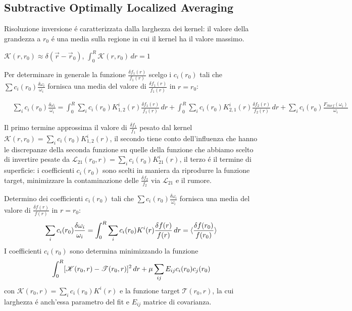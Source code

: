 \documentclass[../main.tex]{subfiles}
\begin{document}
\subsection{Subtractive Optimally Localized Averaging}

\begin{workout}
Risoluzione inversione \'e caratterizzata dalla larghezza dei kernel: il valore della grandezza a $r_0$ \'e una media sulla regione in cui il kernel ha il valore massimo.
\end{workout}

\begin{workout}[OLA]
$\mathcal{K}(r,r_0)\approx\delta(\vec{r}-\vec{r}_0)$, $\int_0^R\mathcal{K}(r,r_0)\,dr=1$
\end{workout}

\begin{workout}

Per determinare in generale la funzione $\frac{\delta f_1(r)}{f_1(r)}$ scelgo i $c_i(r_0)$ tali che $\sum c_i(r_0)\frac{\delta\omega_i}{\omega_i}$ fornisca una media del valore di $\frac{\delta f_1(r)}{f_1(r)}$ in $r=r_0$:

\begin{align*}
&\sum_ic_i(r_0)\frac{\delta\omega_i}{\omega_i}=\int_0^R\sum_ic_i(r_0)K_{1,2}^i(r)\frac{\delta f_1(r)}{f_1(r)}\,dr+\int_0^R\sum_ic_i(r_0)K_{2,1}^i(r)\frac{\delta f_2(r)}{f_2(r)}\,dr+\sum_ic_i(r_0)\frac{F_{Surf}(\omega_i)}{\omega_i}
\end{align*}

Il primo termine approssima il valore di $\frac{\delta f_1}{f_1}$ pesato dal kernel $\mathcal{K}(r,r_0)=\sum_ic_i(r_0)K_{1,2}^i(r)$, il secondo tiene conto dell'influenza che hanno le discrepanze della seconda funzione su quelle della funzione che abbiamo scelto di invertire pesate da $\mathcal{L}_{21}(r_0,r)=\sum_ic_i(r_0)K_{21}^i(r)$, il terzo \'e il termine di superficie: i coefficienti $c_i(r_0)$ sono scelti in maniera da riprodurre la funzione target, minimizzare la contaminazione delle $\frac{\delta f_2}{f_2}$ via $\mathcal{L}_{21}$ e il rumore.

\end{workout}

Determino dei coefficienti $c_i(r_0)$ tali che $\sum c_i(r_0)\frac{\delta\omega_i}{\omega_i}$ fornisca una media del valore di $\frac{\delta f(r)}{f(r)}$ in $r=r_0$:
\begin{equation}\label{eq:SOLAfmean}
\sum_ic_i(r_0)\frac{\delta\omega_i}{\omega_i}=\int_0^R\sum_ic_i(r_0)K^i(r)\frac{\delta f(r)}{f(r)}\,dr=\langle \frac{\delta f(r_0)}{f(r_0)} \rangle
\end{equation}
I coefficienti $c_i(r_0)$ sono determina minimizzando la funzione
\begin{equation}\label{eq:SOLAcir0min}
\int_0^R[\mathcal{K}(r_0,r)-\mathcal{T}(r_0,r)]^2\,dr+\mu\sum_{ij}E_{ij}c_i(r_0)c_j(r_0)\\
\end{equation}
con $\mathcal{K}(r_0,r)=\sum_ic_i(r_0)K^i(r)$ e la funzione target $\mathcal{T}(r_0,r)$, la cui larghezza \'e anch'essa parametro del fit e $E_{ij}$ matrice di covarianza.
\end{document}
